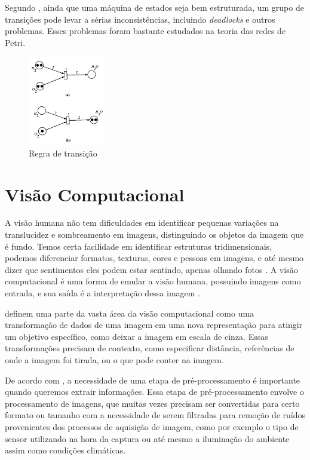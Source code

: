 Segundo , ainda que uma máquina de estados seja bem estruturada, um grupo de transições pode levar a sérias inconsistências, incluindo \textit{deadlocks} e outros problemas. Esses problemas foram bastante estudados na teoria das redes de Petri. 

 \begin{figure}[H]
	\centering
    	\caption{\label{fig:petri}Regra de transição}
		\includegraphics[width = 0.3\textwidth]	{resources/petri}
\end{figure}


\section{Visão Computacional}

A visão humana não tem dificuldades em identificar pequenas variações na translucidez e sombreamento em imagens, distinguindo os objetos da imagem que é fundo. Temos certa facilidade em identificar estruturas tridimensionais, podemos diferenciar formatos, texturas, cores e pessoas em imagens, e até mesmo dizer que sentimentos eles podem estar sentindo, apenas olhando fotos \cite{szeliski2010computer}.
% 
A visão computacional é uma forma de emular a visão humana, possuindo imagens como entrada, e sua saída é a interpretação dessa imagem \cite{marengoni:2009}.

 definem uma parte da vasta área da visão computacional como uma transformação de dados de uma imagem em uma nova representação para atingir um objetivo específico, como deixar a imagem em escala de cinza. Essas transformações precisam de contexto, como especificar distância, referências de onde a imagem foi tirada, ou o que pode conter na imagem.

De acordo com , a necessidade de uma etapa de pré-processamento é importante quando queremos extrair informações. Essa etapa de pré-processamento envolve o processamento de imagens, que muitas vezes precisam ser convertidas para certo formato ou tamanho com a necessidade de serem filtradas para remoção de ruídos provenientes dos processos de aquisição de imagem, como por exemplo o tipo de sensor utilizando na hora da captura ou até mesmo a iluminação do ambiente assim como condições climáticas.

